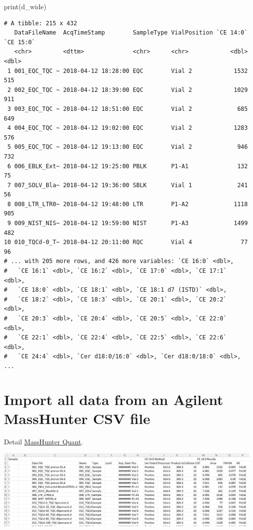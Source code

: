 \documentclass[
  letterpaper,
  DIV=11,
  numbers=noendperiod]{scrreprt}
\newenvironment{Shaded}{\begin{snugshade}}{\end{snugshade}}
\newcommand{\FunctionTok}[1]{\textcolor[rgb]{0.28,0.35,0.67}{#1}}
\newcommand{\NormalTok}[1]{\textcolor[rgb]{0.00,0.23,0.31}{#1}}
\begin{document}
\begin{Shaded}
\begin{Highlighting}[]
\FunctionTok{print}\NormalTok{(d\_wide)}
\end{Highlighting}
\end{Shaded}

\begin{verbatim}
# A tibble: 215 x 432
   DataFileName  AcqTimeStamp        SampleType VialPosition `CE 14:0` `CE 15:0`
   <chr>         <dttm>              <chr>      <chr>            <dbl>     <dbl>
 1 001_EQC_TQC ~ 2018-04-12 18:28:00 EQC        Vial 2            1532       515
 2 002_EQC_TQC ~ 2018-04-12 18:39:00 EQC        Vial 2            1029       911
 3 003_EQC_TQC ~ 2018-04-12 18:51:00 EQC        Vial 2             685       649
 4 004_EQC_TQC ~ 2018-04-12 19:02:00 EQC        Vial 2            1283       576
 5 005_EQC_TQC ~ 2018-04-12 19:13:00 EQC        Vial 2             946       732
 6 006_EBLK_Ext~ 2018-04-12 19:25:00 PBLK       P1-A1              132        75
 7 007_SOLV_Bla~ 2018-04-12 19:36:00 SBLK       Vial 1             241        56
 8 008_LTR_LTR0~ 2018-04-12 19:48:00 LTR        P1-A2             1118       905
 9 009_NIST_NIS~ 2018-04-12 19:59:00 NIST       P1-A3             1499       482
10 010_TQCd-0_T~ 2018-04-12 20:11:00 RQC        Vial 4              77        96
# ... with 205 more rows, and 426 more variables: `CE 16:0` <dbl>,
#   `CE 16:1` <dbl>, `CE 16:2` <dbl>, `CE 17:0` <dbl>, `CE 17:1` <dbl>,
#   `CE 18:0` <dbl>, `CE 18:1` <dbl>, `CE 18:1 d7 (ISTD)` <dbl>,
#   `CE 18:2` <dbl>, `CE 18:3` <dbl>, `CE 20:1` <dbl>, `CE 20:2` <dbl>,
#   `CE 20:3` <dbl>, `CE 20:4` <dbl>, `CE 20:5` <dbl>, `CE 22:0` <dbl>,
#   `CE 22:1` <dbl>, `CE 22:4` <dbl>, `CE 22:5` <dbl>, `CE 22:6` <dbl>,
#   `CE 24:4` <dbl>, `Cer d18:0/16:0` <dbl>, `Cer d18:0/18:0` <dbl>, ...
\end{verbatim}

\hypertarget{import-all-data-from-an-agilent-masshunter-csv-file}{%
\section{Import all data from an Agilent MassHunter CSV
file}\label{import-all-data-from-an-agilent-masshunter-csv-file}}

Detail
\href{https://www.agilent.com/en/product/software-informatics/mass-spectrometry-software/data-analysis/quantitative-analysis}{MassHunter
Quant}.

\includegraphics{./images/paste-A1421EC0.png}
\end{document}
